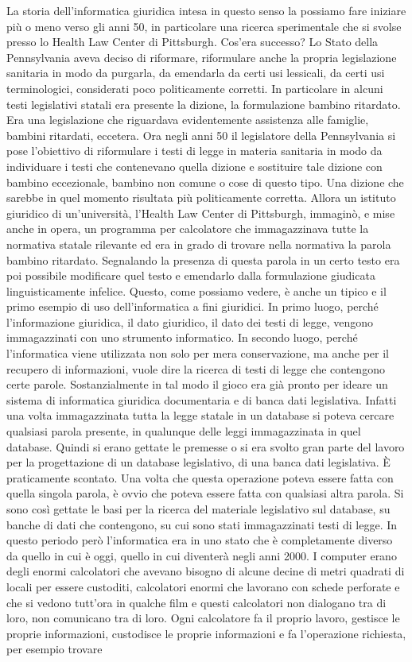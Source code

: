 La storia dell'informatica giuridica intesa in questo senso la possiamo fare iniziare più o meno verso gli anni 50, in particolare una ricerca sperimentale che si svolse presso lo Health Law Center di Pittsburgh. Cos'era successo? Lo Stato della Pennsylvania aveva deciso di riformare, riformulare anche la propria legislazione sanitaria in modo da purgarla, da emendarla da certi usi lessicali, da certi usi terminologici, considerati poco politicamente corretti. In particolare in alcuni testi legislativi statali era presente la dizione, la formulazione bambino ritardato. Era una legislazione che riguardava evidentemente assistenza alle famiglie, bambini ritardati, eccetera. Ora negli anni 50 il legislatore della Pennsylvania si pose l'obiettivo di riformulare i testi di legge in materia sanitaria in modo da individuare i testi che contenevano quella dizione e sostituire tale dizione con bambino eccezionale, bambino non comune o cose di questo tipo. Una dizione che sarebbe in quel momento risultata più politicamente corretta. Allora un istituto giuridico di un'università, l'Health Law Center di Pittsburgh, immaginò, e mise anche in opera, un programma per calcolatore che immagazzinava tutte la normativa statale rilevante ed era in grado di trovare nella normativa la parola bambino ritardato. Segnalando la presenza di questa parola in un certo testo era poi possibile modificare quel testo e emendarlo dalla formulazione giudicata linguisticamente infelice. Questo, come possiamo vedere, è anche un tipico e il primo esempio di uso dell'informatica a fini giuridici. In primo luogo, perché l'informazione giuridica, il dato giuridico, il dato dei testi di legge, vengono immagazzinati con uno strumento informatico. In secondo luogo, perché l'informatica viene utilizzata non solo per mera conservazione, ma anche per il recupero di informazioni, vuole dire la ricerca di testi di legge che contengono certe parole. Sostanzialmente in tal modo il gioco era già pronto per ideare un sistema di informatica giuridica documentaria e di banca dati legislativa. Infatti una volta immagazzinata tutta la legge statale in un database si poteva cercare qualsiasi parola presente, in qualunque delle leggi immagazzinata in quel database. Quindi si erano gettate le premesse o si era svolto gran parte del lavoro per la progettazione di un database legislativo, di una banca dati legislativa. È praticamente scontato. Una volta che questa operazione poteva essere fatta con quella singola parola, è ovvio che poteva essere fatta con qualsiasi altra parola. Si sono così gettate le basi per la ricerca del materiale legislativo sul database, su banche di dati che contengono, su cui sono stati immagazzinati testi di legge. In questo periodo però l'informatica era in uno stato che è completamente diverso da quello in cui è oggi, quello in cui diventerà negli anni 2000. I computer erano degli enormi calcolatori che avevano bisogno di alcune decine di metri quadrati di locali per essere custoditi, calcolatori enormi che lavorano con schede perforate e che si vedono tutt'ora in qualche film e questi calcolatori non dialogano tra di loro, non comunicano tra di loro. Ogni calcolatore fa il proprio lavoro, gestisce le proprie informazioni, custodisce le proprie informazioni e fa l'operazione richiesta, per esempio trovare 